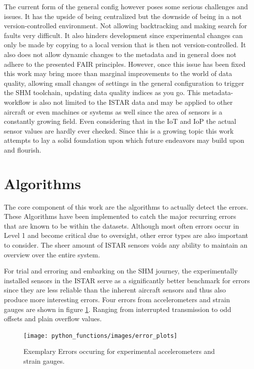 The current form of the general config however poses some serious challenges and issues. It has the upside of being centralized but the downside of being in a not version-controlled environment. Not allowing backtracking and making search for faults very difficult. It also hinders development since experimental changes can only be made by copying to a local version that is then not version-controlled. It also does not allow dynamic changes to the metadata and in general does not adhere to the presented FAIR principles. However, once this issue has been fixed this work may bring more than marginal improvements to the world of data quality, allowing small changes of settings in the general configuration to trigger the SHM toolchain, updating data quality indices as you go. This metadata-workflow is also not limited to the  ISTAR data and may be applied to other aircraft or even machines or systems as well since the area of sensors is a constantly growing field. Even considering that in the IoT and IoP \cite{pennekamp_towards_2019} the actual sensor values are hardly ever checked. Since this is a growing topic this work attempts to lay a solid foundation upon which future endeavors may build upon and flourish.


\section{Algorithms}

The core component of this work are the algorithms to actually detect the errors. These Algorithms have been implemented to catch the major recurring errors that are known to be within the datasets. Although most often errors occur in Level 1 and become critical due to oversight, other error types are also important to consider. The sheer amount of ISTAR sensors voids any ability to maintain an overview over the entire system.

For trial and erroring and embarking on the SHM journey, the experimentally installed sensors in the ISTAR serve as a significantly better benchmark for errors since they are less reliable than the inherent aircraft sensors and thus also produce more interesting errors. Four errors from accelerometers and strain gauges are shown in figure \ref{fig:error_plots}. Ranging from interrupted transmission to odd offsets and plain overflow values.

\begin{figure}[h]
    \centering
    \texttt{[image: python\_functions/images/error\_plots]}
    \caption{Exemplary Errors occuring for experimental accelerometers and strain gauges.}
    \label{fig:error_plots}
\end{figure}


